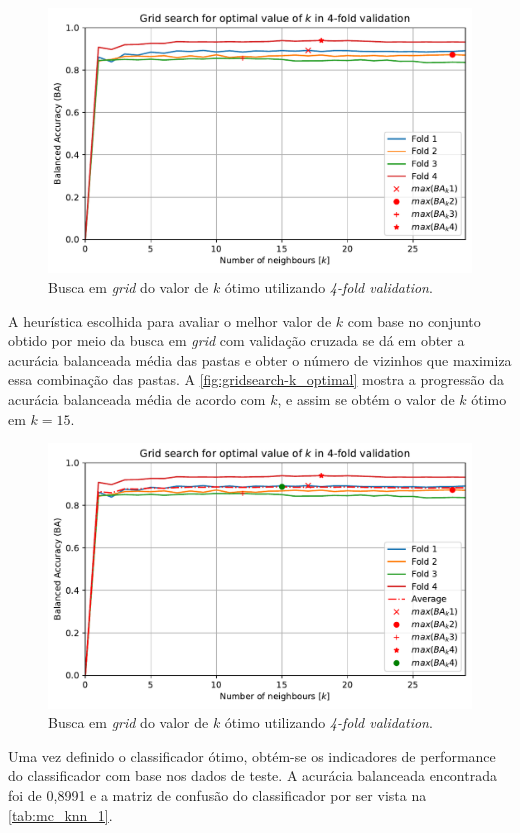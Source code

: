 \begin{figure}[H]
	\centering
	\includegraphics[width=0.75\linewidth]{../../plot/knn_1/grid_search_k_fold}
	\caption{Busca em \textit{grid} do valor de $k$ ótimo utilizando \textit{4-fold validation}.}
	\label{fig:gridsearch}
\end{figure}

A heurística escolhida para avaliar o melhor valor de $k$ com base no conjunto obtido por meio da busca em \textit{grid} com validação cruzada se dá em obter a acurácia balanceada média das pastas e obter o número de vizinhos que maximiza essa combinação das pastas. A \autoref{fig:gridsearch-k_optimal} mostra a progressão da acurácia balanceada média de acordo com $k$, e assim se obtém o valor de $k$ ótimo em $k = 15$.

\begin{figure}[H]
	\centering
	\includegraphics[width=0.75\linewidth]{../../plot/knn_1/grid_search_k_fold-k_optimal}
	\caption{Busca em \textit{grid} do valor de $k$ ótimo utilizando \textit{4-fold validation}.}
	\label{fig:gridsearch-k_optimal}
\end{figure}



Uma vez definido o classificador ótimo, obtém-se os indicadores de performance do classificador com base nos dados de teste. A acurácia balanceada encontrada foi de 0,8991 e a matriz de confusão do classificador por ser vista na \autoref{tab:mc_knn_1}.

